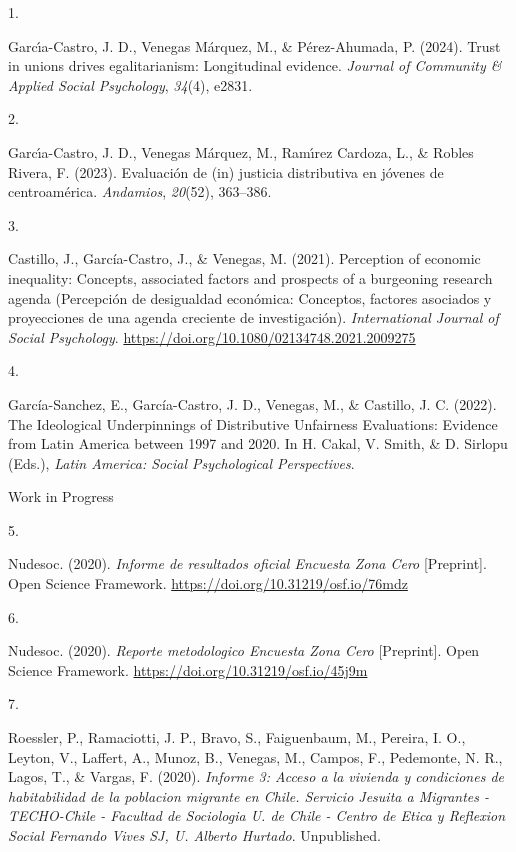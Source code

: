 \documentclass[11pt,a4paper,]{awesome-cv}
\newlength{\cslhangindent}
\newlength{\csllabelwidth}
\newenvironment{CSLReferences}[2] %
 {\begin{list}{}{%
  \setlength{\itemindent}{0pt}
  \setlength{\leftmargin}{0pt}
  \setlength{\parsep}{0pt}
  \ifodd #1
   \setlength{\leftmargin}{\cslhangindent}
   \setlength{\itemindent}{-1\cslhangindent}
  \fi
  \setlength{\itemsep}{#2\baselineskip}}}
 {\end{list}}
\newcommand{\CSLBlock}[1]{\hfill\break\parbox[t]{\linewidth}{\strut\ignorespaces#1\strut}}
\newcommand{\CSLLeftMargin}[1]{\parbox[t]{\csllabelwidth}{\strut#1\strut}}
\newcommand{\CSLRightInline}[1]{\parbox[t]{\linewidth - \csllabelwidth}{\strut#1\strut}}
\begin{document}
\hypertarget{refs-b585e8bb1c095d4b76a9060900dcda7a}{}
\begin{CSLReferences}{0}{0}
\leavevmode{}%
\CSLLeftMargin{1. }%
\CSLRightInline{Garcı́a-Castro, J. D., Venegas Márquez, M., \&
Pérez-Ahumada, P. (2024). Trust in unions drives egalitarianism:
Longitudinal evidence. \emph{Journal of Community \& Applied Social
Psychology}, \emph{34}(4), e2831.}

\leavevmode{}%
\CSLLeftMargin{2. }%
\CSLRightInline{Garcı́a-Castro, J. D., Venegas Márquez, M., Ramı́rez
Cardoza, L., \& Robles Rivera, F. (2023). Evaluación de (in) justicia
distributiva en jóvenes de centroamérica. \emph{Andamios},
\emph{20}(52), 363--386.}

\leavevmode{}%
\CSLLeftMargin{3. }%
\CSLRightInline{Castillo, J., García-Castro, J., \& Venegas, M. (2021).
Perception of economic inequality: Concepts, associated factors and
prospects of a burgeoning research agenda (Percepción de desigualdad
económica: Conceptos, factores asociados y proyecciones de una agenda
creciente de investigación). \emph{International Journal of Social
Psychology}. \url{https://doi.org/10.1080/02134748.2021.2009275}}

\leavevmode{}%
\CSLLeftMargin{4. }%
\CSLRightInline{García-Sanchez, E., García-Castro, J. D., Venegas, M.,
\& Castillo, J. C. (2022). The Ideological Underpinnings of Distributive
Unfairness Evaluations: Evidence from Latin America between 1997 and
2020. In H. Cakal, V. Smith, \& D. Sirlopu (Eds.), \emph{Latin America:
Social Psychological Perspectives}.
\CSLBlock{Work in Progress}}

\leavevmode{}%
\CSLLeftMargin{5. }%
\CSLRightInline{Nudesoc. (2020). \emph{Informe de resultados oficial
Encuesta Zona Cero} {[}Preprint{]}. Open Science Framework.
\url{https://doi.org/10.31219/osf.io/76mdz}}

\leavevmode{}%
\CSLLeftMargin{6. }%
\CSLRightInline{Nudesoc. (2020). \emph{Reporte metodologico Encuesta
Zona Cero} {[}Preprint{]}. Open Science Framework.
\url{https://doi.org/10.31219/osf.io/45j9m}}

\leavevmode{}%
\CSLLeftMargin{7. }%
\CSLRightInline{Roessler, P., Ramaciotti, J. P., Bravo, S., Faiguenbaum,
M., Pereira, I. O., Leyton, V., Laffert, A., Munoz, B., Venegas, M.,
Campos, F., Pedemonte, N. R., Lagos, T., \& Vargas, F. (2020).
\emph{Informe 3: Acceso a la vivienda y condiciones de habitabilidad de
la poblacion migrante en Chile. Servicio Jesuita a Migrantes -
TECHO-Chile - Facultad de Sociologia U. de Chile - Centro de Etica y
Reflexion Social Fernando Vives SJ, U. Alberto Hurtado}. Unpublished.}


\end{CSLReferences}
\end{document}
